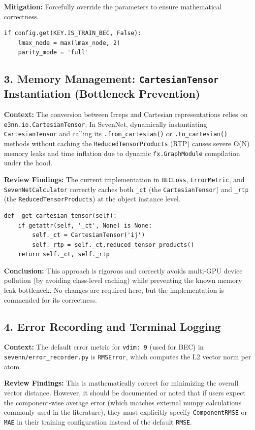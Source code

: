\documentclass[12pt]{article}
\begin{document}
\textbf{Mitigation:} Forcefully override the parameters to ensure mathematical correctness.
\begin{verbatim}
if config.get(KEY.IS_TRAIN_BEC, False):
    lmax_node = max(lmax_node, 2)
    parity_mode = 'full'
\end{verbatim}

\subsection{3. Memory Management: \texttt{CartesianTensor} Instantiation (Bottleneck Prevention)}
\textbf{Context:} The conversion between Irreps and Cartesian representations relies on \texttt{e3nn.io.CartesianTensor}. In SevenNet, dynamically instantiating \texttt{CartesianTensor} and calling its \texttt{.from\_cartesian()} or \texttt{.to\_cartesian()} methods without caching the \texttt{ReducedTensorProducts} (RTP) causes severe O(N) memory leaks and time inflation due to dynamic \texttt{fx.GraphModule} compilation under the hood.

\textbf{Review Findings:} The current implementation in \texttt{BECLoss}, \texttt{ErrorMetric}, and \texttt{SevenNetCalculator} correctly caches both \texttt{\_ct} (the \texttt{CartesianTensor}) and \texttt{\_rtp} (the \texttt{ReducedTensorProducts}) at the object instance level.
\begin{verbatim}
def _get_cartesian_tensor(self):
    if getattr(self, '_ct', None) is None:
        self._ct = CartesianTensor('ij')
        self._rtp = self._ct.reduced_tensor_products()
    return self._ct, self._rtp
\end{verbatim}
\textbf{Conclusion:} This approach is rigorous and correctly avoids multi-GPU device pollution (by avoiding class-level caching) while preventing the known memory leak bottleneck. No changes are required here, but the implementation is commended for its correctness.

\subsection{4. Error Recording and Terminal Logging}
\textbf{Context:} The default error metric for \texttt{vdim: 9} (used for BEC) in \texttt{sevenn/error\_recorder.py} is \texttt{RMSError}, which computes the L2 vector norm per atom.

\textbf{Review Findings:} This is mathematically correct for minimizing the overall vector distance. However, it should be documented or noted that if users expect the component-wise average error (which matches external numpy calculations commonly used in the literature), they must explicitly specify \texttt{ComponentRMSE} or \texttt{MAE} in their training configuration instead of the default \texttt{RMSE}.
\end{document}
